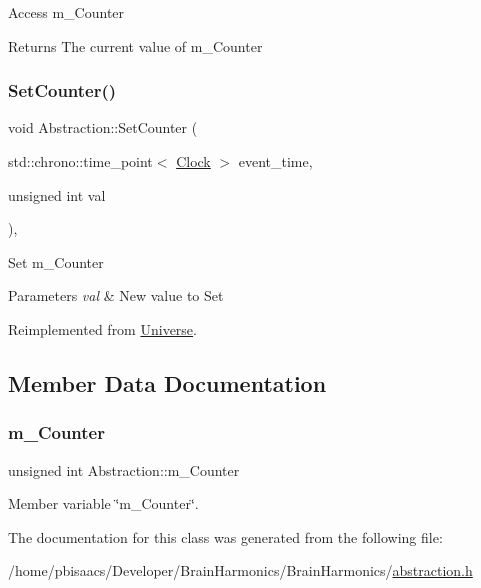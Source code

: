 Access m\+\_\+\+Counter \begin{DoxyReturn}{Returns}
The current value of m\+\_\+\+Counter 
\end{DoxyReturn}
\mbox{\label{classAbstraction_a82cd32bf3de41f35ab76d80611fe6763}} 
\subsubsection{\texorpdfstring{Set\+Counter()}{SetCounter()}}
{\footnotesize\ttfamily void Abstraction\+::\+Set\+Counter (\begin{DoxyParamCaption}\item[{std\+::chrono\+::time\+\_\+point$<$ \mbox{\hyperlink{universe_8h_a0ef8d951d1ca5ab3cfaf7ab4c7a6fd80}{Clock}} $>$}]{event\+\_\+time,  }\item[{unsigned int}]{val }\end{DoxyParamCaption})\hspace{0.3cm}{\ttfamily [inline]}, {\ttfamily [virtual]}}

Set m\+\_\+\+Counter 
\begin{DoxyParams}{Parameters}
{\em val} & New value to Set \\
\hline
\end{DoxyParams}


Reimplemented from \mbox{\hyperlink{classUniverse_aa22202ae740eb1355529afcb13285e91}{Universe}}.



\subsection{Member Data Documentation}
\mbox{\label{classAbstraction_a6144b0e382f72ad170a238d6ed4a0486}} 
\subsubsection{\texorpdfstring{m\+\_\+\+Counter}{m\_Counter}}
{\footnotesize\ttfamily unsigned int Abstraction\+::m\+\_\+\+Counter\hspace{0.3cm}{\ttfamily [private]}}



Member variable \char`\"{}m\+\_\+\+Counter\char`\"{}. 



The documentation for this class was generated from the following file\+:\begin{DoxyCompactItemize}
\item 
/home/pbisaacs/\+Developer/\+Brain\+Harmonics/\+Brain\+Harmonics/\mbox{\hyperlink{abstraction_8h}{abstraction.\+h}}\end{DoxyCompactItemize}
